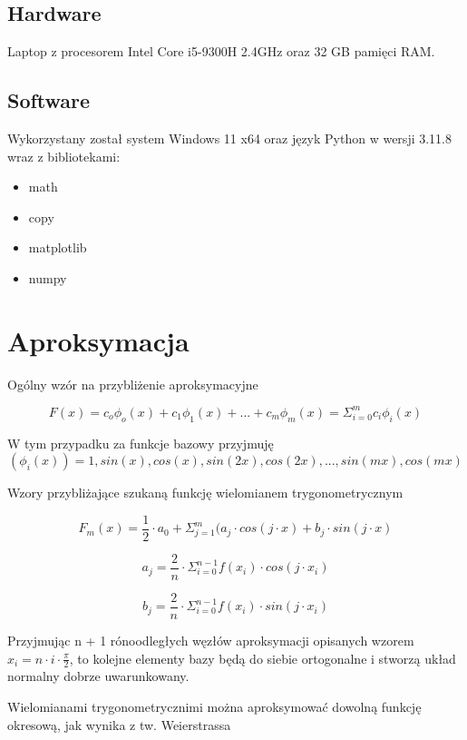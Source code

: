 \documentclass{article}
\begin{document}
\subsection{Hardware}

Laptop z procesorem Intel Core i5-9300H 2.4GHz oraz 32 GB pamięci RAM.

\subsection{Software}

Wykorzystany został system Windows 11 x64 oraz język Python w wersji 3.11.8 wraz z bibliotekami:
\begin{itemize}
\item math
\item copy
\item matplotlib
\item numpy
\end{itemize}

\newpage

\section{Aproksymacja}

Ogólny wzór na przybliżenie aproksymacyjne

\[F(x) = c_o\phi_o(x) + c_1\phi_1(x) + ... + c_m\phi_m(x) = \Sigma_{i=0}^{m}c_i\phi_i(x)\]

\noindent
W tym przypadku za funkcje bazowy przyjmuję
\[(\phi_i(x)) = 1, sin(x), cos(x), sin(2x), cos(2x), ..., sin(mx), cos(mx)\]

\noindent
Wzory przybliżające szukaną funkcję wielomianem trygonometrycznym

\[F_m(x) = \frac{1}{2} \cdot a_0 + \Sigma_{j=1}^{m}(a_j \cdot cos(j \cdot x) + b_j \cdot sin(j \cdot x)\]

\[a_j = \frac{2}{n} \cdot \Sigma_{i=0}^{n-1}f(x_i) \cdot cos(j \cdot x_i)\]

\[b_j = \frac{2}{n} \cdot \Sigma_{i=0}^{n-1}f(x_i) \cdot sin(j \cdot x_i)\]

\noindent
Przyjmując n + 1 rónoodległych węzłów aproksymacji opisanych wzorem \(x_i = n \cdot i \cdot \frac{\pi}{2}\), to kolejne elementy bazy będą do siebie ortogonalne i stworzą układ normalny dobrze uwarunkowany.

\noindent
Wielomianami trygonometrycznimi można aproksymować dowolną funkcję okresową, jak wynika z tw. Weierstrassa

\bigbreak
\end{document}
